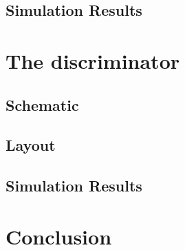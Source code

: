\documentclass[a4paper,12pt,twoside]{article}
\begin{document}
	\subsection{Simulation Results}
	
	\section{The discriminator}
	
	\subsection{Schematic}
	
	\subsection{Layout}
	
	\subsection{Simulation Results}
	
	\section{Conclusion}
	
\end{document}
